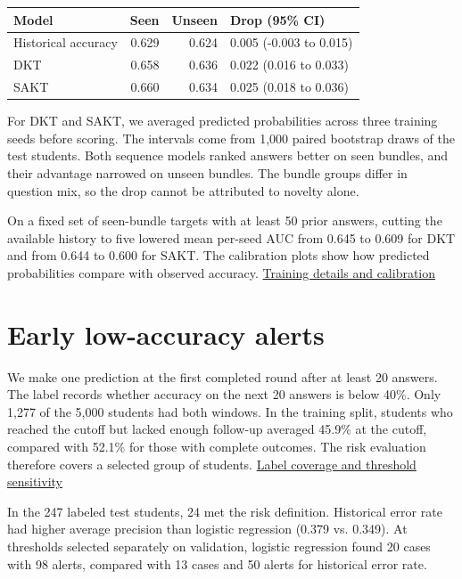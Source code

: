 \documentclass[10pt,a4paper,twocolumn]{article}
\begin{document}
\begin{center}
\small\setlength{\tabcolsep}{3pt}
\begin{tabular}{@{}lrrl@{}}
\toprule
Model & Seen & Unseen & Drop (95\% CI) \\
\midrule
Historical accuracy & 0.629 & 0.624 & 0.005 (-0.003 to 0.015) \\
DKT & 0.658 & 0.636 & 0.022 (0.016 to 0.033) \\
SAKT & 0.660 & 0.634 & 0.025 (0.018 to 0.036) \\
\bottomrule
\end{tabular}
\end{center}

For DKT and SAKT, we averaged predicted probabilities across three training seeds before scoring. The intervals come from 1,000 paired bootstrap draws of the test students. Both sequence models ranked answers better on seen bundles, and their advantage narrowed on unseen bundles. The bundle groups differ in question mix, so the drop cannot be attributed to novelty alone.

On a fixed set of seen-bundle targets with at least 50 prior answers, cutting the available history to five lowered mean per-seed AUC from 0.645 to 0.609 for DKT and from 0.644 to 0.600 for SAKT. The calibration plots show how predicted probabilities compare with observed accuracy. \href{https://github.com/jsbach2276562632-wq/ednet-learning-traces/blob/main/results/knowledge_tracing.md}{Training details and calibration}

\clearpage
\section{Early low-accuracy alerts}

We make one prediction at the first completed round after at least 20 answers. The label records whether accuracy on the next 20 answers is below 40\%. Only 1,277 of the 5,000 students had both windows. In the training split, students who reached the cutoff but lacked enough follow-up averaged 45.9\% at the cutoff, compared with 52.1\% for those with complete outcomes. The risk evaluation therefore covers a selected group of students. \href{https://github.com/jsbach2276562632-wq/ednet-learning-traces/blob/main/results/risk_eda.md}{Label coverage and threshold sensitivity}

In the 247 labeled test students, 24 met the risk definition. Historical error rate had higher average precision than logistic regression (0.379 vs. 0.349). At thresholds selected separately on validation, logistic regression found 20 cases with 98 alerts, compared with 13 cases and 50 alerts for historical error rate.
\end{document}
